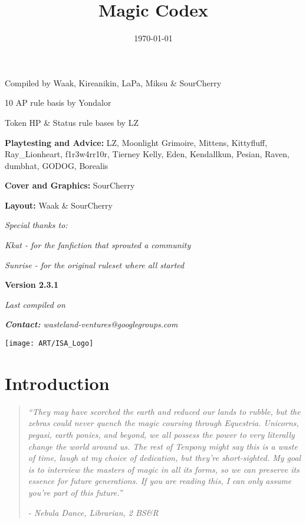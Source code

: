 \documentclass[11pt,a4paper,twocolumn]{book}
\title{Magic Codex}
\date{\today}
\begin{document}
	
			
	\onecolumn
	\setcounter{page}{1}	
\begin{center}
	Compiled by Waak, Kireanikin, LaPa, Miksu \& SourCherry
	
	10 AP rule basis by Yondalor
	
	Token HP \& Status rule bases by LZ
	
	\bigskip		
	\textbf{Playtesting and Advice:} LZ, Moonlight Grimoire, Mittens, Kittyfluff, Ray\_Lionheart, f1r3w4rr10r, Tierney Kelly, Eden, Kendallkun, Pesian, Raven, dumbhat, GODOG, Borealis
	
	\bigskip
	\textbf{Cover and Graphics:} SourCherry
	
	\bigskip
	\textbf{Layout:} Waak \& SourCherry
	
	\bigskip
	\emph{	Special thanks to:}
	
	\emph{	Kkat - for the fanfiction that sprouted a community}
	
	\emph{	Sunrise - for the original ruleset where all started}
\end{center}


\vfill

\begin{center}
	\textbf{Version 2.3.1}
	
	\emph{Last compiled on \thedate}
	
	\emph{\textbf{Contact:} wasteland-ventures@googlegroups.com}
	
\end{center}	
\begin{figure*}[bp]
	\centering
	\texttt{[image: ART/ISA\_Logo]}
\end{figure*}

\twocolumn
\tableofcontents

%

\chapter{Introduction}
\begin{quote}
	\emph{``They may have scorched the earth and reduced our lands to rubble, but the zebras could never quench the magic coursing through Equestria. Unicorns, pegasi, earth ponies, and beyond, we all possess the power to very literally change the world around us. The rest of Tenpony might say this is a waste of time, laugh at my choice of dedication, but they're short-sighted. My goal is to interview the masters of magic in all its forms, so we can preserve its essence for future generations. If you are reading this, I can only assume you're part of this future.''}
	
	\emph{- Nebula Dance, Librarian, 2 BS\&R}
\end{quote}
\end{document}
